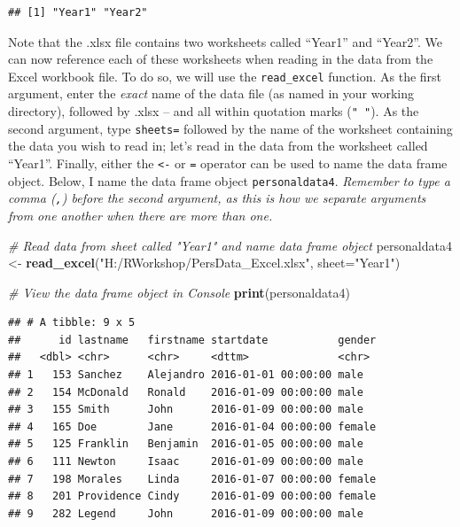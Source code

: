 \documentclass[]{book}
\newenvironment{Shaded}{\begin{snugshade}}{\end{snugshade}}
\newcommand{\KeywordTok}[1]{\textcolor[rgb]{0.13,0.29,0.53}{\textbf{#1}}}
\newcommand{\DataTypeTok}[1]{\textcolor[rgb]{0.13,0.29,0.53}{#1}}
\newcommand{\StringTok}[1]{\textcolor[rgb]{0.31,0.60,0.02}{#1}}
\newcommand{\CommentTok}[1]{\textcolor[rgb]{0.56,0.35,0.01}{\textit{#1}}}
\newcommand{\NormalTok}[1]{#1}
\begin{document}
\begin{verbatim}
## [1] "Year1" "Year2"
\end{verbatim}

Note that the .xlsx file contains two worksheets called ``Year1'' and
``Year2''. We can now reference each of these worksheets when reading in
the data from the Excel workbook file. To do so, we will use the
\texttt{read\_excel} function. As the first argument, enter the
\emph{exact} name of the data file (as named in your working directory),
followed by .xlsx -- and all within quotation marks (\texttt{"\ "}). As
the second argument, type \texttt{sheets=} followed by the name of the
worksheet containing the data you wish to read in; let's read in the
data from the worksheet called ``Year1''. Finally, either the
\texttt{\textless{}-} or \texttt{=} operator can be used to name the
data frame object. Below, I name the data frame object
\texttt{personaldata4}. \emph{Remember to type a comma (\texttt{,})
before the second argument, as this is how we separate arguments from
one another when there are more than one.}

\begin{Shaded}
\begin{Highlighting}[]
\CommentTok{# Read data from sheet called "Year1" and name data frame object}
\NormalTok{personaldata4 <-}\StringTok{ }\KeywordTok{read_excel}\NormalTok{(}\StringTok{"H:/RWorkshop/PersData_Excel.xlsx"}\NormalTok{, }\DataTypeTok{sheet=}\StringTok{"Year1"}\NormalTok{)}
\end{Highlighting}
\end{Shaded}

\begin{Shaded}
\begin{Highlighting}[]
\CommentTok{# View the data frame object in Console}
\KeywordTok{print}\NormalTok{(personaldata4)}
\end{Highlighting}
\end{Shaded}

\begin{verbatim}
## # A tibble: 9 x 5
##      id lastname   firstname startdate           gender
##   <dbl> <chr>      <chr>     <dttm>              <chr> 
## 1   153 Sanchez    Alejandro 2016-01-01 00:00:00 male  
## 2   154 McDonald   Ronald    2016-01-09 00:00:00 male  
## 3   155 Smith      John      2016-01-09 00:00:00 male  
## 4   165 Doe        Jane      2016-01-04 00:00:00 female
## 5   125 Franklin   Benjamin  2016-01-05 00:00:00 male  
## 6   111 Newton     Isaac     2016-01-09 00:00:00 male  
## 7   198 Morales    Linda     2016-01-07 00:00:00 female
## 8   201 Providence Cindy     2016-01-09 00:00:00 female
## 9   282 Legend     John      2016-01-09 00:00:00 male
\end{verbatim}
\end{document}

